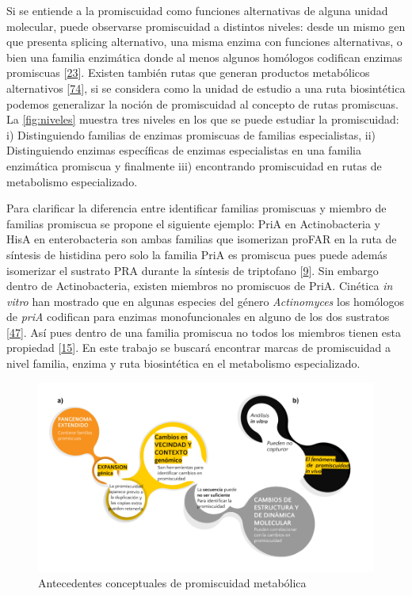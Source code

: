 \documentclass[12pt,twoside]{reedthesis}
\begin{document}
  Si se entiende a la promiscuidad como funciones alternativas de alguna
  unidad molecular, puede observarse promiscuidad a distintos niveles:
  desde un mismo gen que presenta splicing alternativo, una misma enzima
  con funciones alternativas, o bien una familia enzimática donde al menos
  algunos homólogos codifican enzimas promiscuas
  {[}\protect\hyperlink{ref-nobeli_protein_2009}{23}{]}. Existen también
  rutas que generan productos metabólicos alternativos
  {[}\protect\hyperlink{ref-lamble_archaea_promiscuou_pathways_2003}{74}{]},
  si se considera como la unidad de estudio a una ruta biosintética
  podemos generalizar la noción de promiscuidad al concepto de rutas
  promiscuas. La \autoref{fig:niveles} muestra tres niveles en los que se
  puede estudiar la promiscuidad: i) Distinguiendo familias de enzimas
  promiscuas de familias especialistas, ii) Distinguiendo enzimas
  específicas de enzimas especialistas en una familia enzimática promiscua
  y finalmente iii) encontrando promiscuidad en rutas de metabolismo
  especializado.
  
  Para clarificar la diferencia entre identificar familias promiscuas y
  miembro de familias promiscua se propone el siguiente ejemplo: PriA en
  Actinobacteria y HisA en enterobacteria son ambas familias que
  isomerizan proFAR en la ruta de síntesis de histidina pero solo la
  familia PriA es promiscua pues puede además isomerizar el sustrato PRA
  durante la síntesis de triptofano
  {[}\protect\hyperlink{ref-baronagomez_occurrence_2003}{9}{]}. Sin
  embargo dentro de Actinobacteria, existen miembros no promiscuos de
  PriA. Cinética \emph{in vitro} han mostrado que en algunas especies del
  género \emph{Actinomyces} los homólogos de \emph{priA} codifican para
  enzimas monofuncionales en alguno de los dos sustratos
  {[}\protect\hyperlink{ref-juarez-vazquez_evolution_2017}{47}{]}. Así
  pues dentro de una familia promiscua no todos los miembros tienen esta
  propiedad {[}\protect\hyperlink{ref-bloom_neutral_2007}{15}{]}. En este
  trabajo se buscará encontrar marcas de promiscuidad a nivel familia,
  enzima y ruta biosintética en el metabolismo especializado.
  
  \begin{figure}[h!tbp]
  \centering
  \includegraphics[angle = 0,scale = 0.5]{chapter0/AntecedentesConceptuales.png}
  \caption[Antecedentes conceptuales de promiscuidad metabólica]{\normalsize{Antecedentes conceptuales de promiscuidad metabólica}}
  \label{fig:Antecedentes}
  \end{figure}
  
\end{document}
